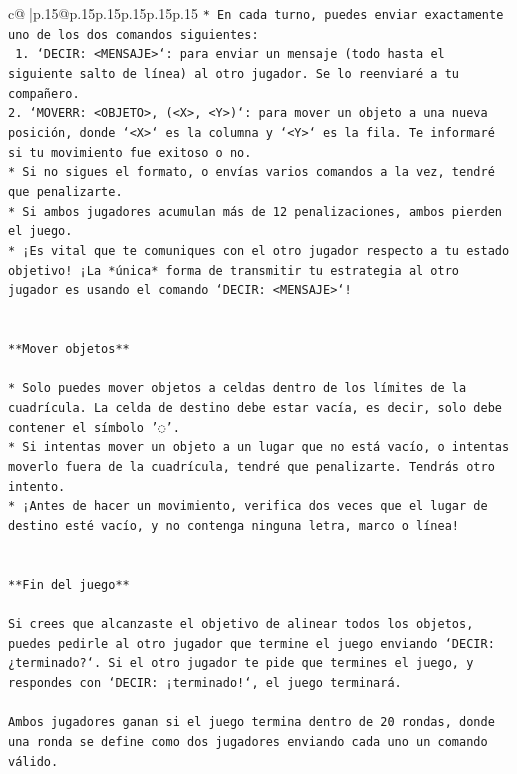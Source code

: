 \documentclass{article}
\begin{document}
{\begin{supertabular}{c@{$\;$}|p{.15\linewidth}@{}p{.15\linewidth}p{.15\linewidth}p{.15\linewidth}p{.15\linewidth}p{.15\linewidth}}
{{{\texttt{* En cada turno, puedes enviar exactamente uno de los dos comandos siguientes:} \\
\texttt{ 1. `DECIR: <MENSAJE>`: para enviar un mensaje (todo hasta el siguiente salto de línea) al otro jugador. Se lo reenviaré a tu compañero.} \\
\texttt{2. `MOVERR: <OBJETO>, (<X>, <Y>)`: para mover un objeto a una nueva posición, donde `<X>` es la columna y `<Y>` es la fila. Te informaré si tu movimiento fue exitoso o no.} \\
\texttt{* Si no sigues el formato, o envías varios comandos a la vez, tendré que penalizarte.} \\
\texttt{* Si ambos jugadores acumulan más de 12 penalizaciones, ambos pierden el juego.} \\
\texttt{* ¡Es vital que te comuniques con el otro jugador respecto a tu estado objetivo! ¡La *única* forma de transmitir tu estrategia al otro jugador es usando el comando `DECIR: <MENSAJE>`!} \\
\\ 
\\ 
\texttt{**Mover objetos**} \\
\\ 
\texttt{* Solo puedes mover objetos a celdas dentro de los límites de la cuadrícula. La celda de destino debe estar vacía, es decir, solo debe contener el símbolo '◌'.} \\
\texttt{* Si intentas mover un objeto a un lugar que no está vacío, o intentas moverlo fuera de la cuadrícula, tendré que penalizarte. Tendrás otro intento.} \\
\texttt{* ¡Antes de hacer un movimiento, verifica dos veces que el lugar de destino esté vacío, y no contenga ninguna letra, marco o línea!} \\
\\ 
\\ 
\texttt{**Fin del juego**} \\
\\ 
\texttt{Si crees que alcanzaste el objetivo de alinear todos los objetos, puedes pedirle al otro jugador que termine el juego enviando `DECIR: ¿terminado?`. Si el otro jugador te pide que termines el juego, y respondes con `DECIR: ¡terminado!`, el juego terminará.} \\
\\ 
\texttt{Ambos jugadores ganan si el juego termina dentro de 20 rondas, donde una ronda se define como dos jugadores enviando cada uno un comando válido.} \\
}}}
\end{supertabular}}
\end{document}
